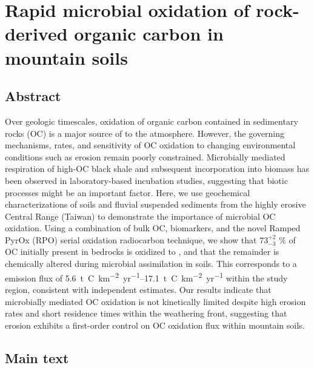 \chapter{Rapid microbial oxidation of rock-derived organic carbon in mountain soils}
\label{Ch6}
\raggedbottom

{\let\thefootnote\relax{}}

\clearpage

\section{Abstract}

Over geologic timescales, oxidation of organic carbon contained in sedimentary rocks (OC) is a major source of  to the atmosphere. However, the governing mechanisms, rates, and sensitivity of OC oxidation to changing environmental conditions such as erosion remain poorly constrained. Microbially mediated respiration of high-OC black shale and subsequent incorporation into biomass has been observed in laboratory-based incubation studies, suggesting that biotic processes might be an important factor. Here, we use geochemical characterizations of soils and fluvial suspended sediments from the highly erosive Central Range (Taiwan) to demonstrate the importance of microbial OC oxidation. Using a combination of bulk OC, biomarkers, and the novel Ramped PyrOx (RPO) serial oxidation radiocarbon technique, we show that $73^{+2}_{-3}$ \% of OC initially present in bedrocks is oxidized to , and that the remainder is chemically altered during microbial assimilation in soils. This corresponds to a  emission flux of \SIrange{5.6}{17.1}{t.C.km^{-2}.yr^{-1}} within the study region, consistent with independent estimates. Our results indicate that microbially mediated OC oxidation is not kinetically limited despite high erosion rates and short residence times within the weathering front, suggesting that erosion exhibits a first-order control on OC oxidation flux within mountain soils.

\section{Main text}

